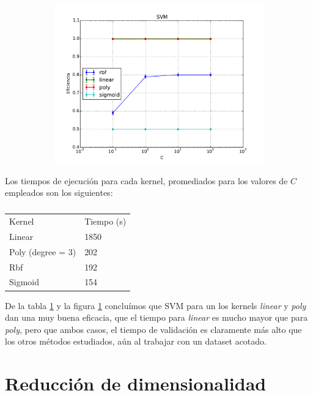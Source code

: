 \documentclass[a4paper,10pt]{article}
\begin{document}
\begin{figure}[H]
  \centering
  \begin{subfigure}[b]{0.4\textwidth}
    \includegraphics[width=\textwidth]{../imagenes/SVM}
    
  \end{subfigure}
    \caption{}
  \label{fig:svm}
\end{figure}

\par Los tiempos de ejecución para cada kernel, promediados para los valores de $C$ empleados son los siguientes:
\begin{table}[H]
\centering
\caption{}
\label{table:time_svm}
\begin{tabular}{ll}
Kernel & Tiempo (s) \\
Linear & 1850 \\
Poly (degree = 3) & 202 \\
Rbf & 192 \\
Sigmoid & 154 \\
\end{tabular}
\end{table}
De la tabla \ref{table:time_svm} y la figura \ref{fig:svm} concluímos que SVM para un los kernels \emph{linear} y \emph{poly} dan una muy buena eficacia, que el tiempo para \emph{linear} es mucho mayor que para \emph{poly}, pero que ambos casos, el tiempo de validación es claramente más alto que los otros métodos estudiados, aún al trabajar con un dataset acotado.


\section{Reducci\'on de dimensionalidad} \label{sec:seleccion}
\end{document}
